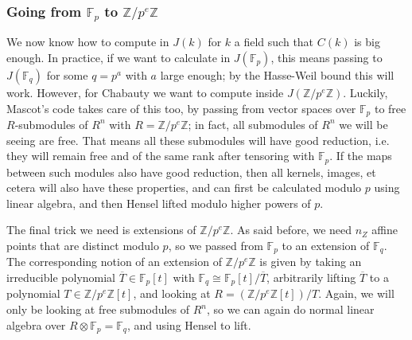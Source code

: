 \documentclass[12pt]{article}
\newcommand{\Z}{\mathbb{Z}}
\newcommand{\F}{\mathbb{F}}
\newcommand{\tensor}{\otimes}
\theoremstyle{plain}
\theoremstyle{definition}
\theoremstyle{remark}
\begin{document}
\subsubsection{Going from \texorpdfstring{$\F_p$}{Fp} to \texorpdfstring{$\Z/p^e\Z$}{Z/peZ}}
We now know how to compute in $J(k)$ for $k$ a field such that $C(k)$ is big enough. In practice, if we want to calculate in $J(\F_p)$, this means passing to $J(\F_q)$ for some $q = p^a$ with $a$ large enough; by the Hasse-Weil bound this will work. However, for Chabauty we want to compute inside $J(\Z/p^e\Z)$. Luckily, Mascot's code takes care of this too, by passing from vector spaces over $\F_p$ to free $R$-submodules of $R^n$ with $R = \Z/p^e\Z$; in fact, all submodules of $R^n$ we will be seeing are free. That means all these submodules will have good reduction, i.e. they will remain free and of the same rank after tensoring with $\F_p$. If the maps between such modules also have good reduction, then all kernels, images, et cetera will also have these properties, and can first be calculated modulo $p$ using linear algebra, and then Hensel lifted modulo higher powers of $p$.

The final trick we need is extensions of $\Z/p^e\Z$. As said before, we need $n_Z$ affine points that are distinct modulo $p$, so we passed from $\F_p$ to an extension of $\F_q$. The corresponding notion of an extension of $\Z/p^e\Z$ is given by taking an irreducible polynomial $\overline{T} \in \F_p[t]$ with $\F_q \cong \F_p[t]/\overline{T}$, arbitrarily lifting $\overline{T}$ to a polynomial $T \in \Z/p^e\Z[t]$, and looking at $R = (\Z/p^e\Z[t])/T$. Again, we will only be looking at free submodules of $R^n$, so we can again do normal linear algebra over $R \tensor \F_p = \F_q$, and using Hensel to lift.
\end{document}
